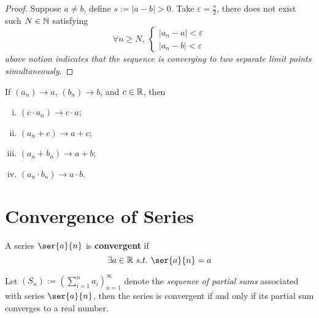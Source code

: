 \documentclass[11pt]{article}
\begin{document}
        \begin{proof}
            Suppose $a \neq b$, define $s:= |a-b| > 0$. Take $\varepsilon = \frac{s}{2}$, there does not exist such $N \in \mathbb{N}$ satisfying 
            \begin{equation}
                \forall n \geq N,\ 
                \begin{cases}
                    |a_n - a| < \varepsilon \\
                    |a_n - b| < \varepsilon
                \end{cases}
            \end{equation}
            \emph{above notion indicates that the sequence is converging to two separate limit points simultaneously}.
        \end{proof}
        
        \begin{theorem}
            If $(a_n) \to a$, $(b_n) \to b$, and $c \in \mathbb{R}$, then
            \begin{enumerate}[(i)]
                \item $(c \cdot a_n) \to c \cdot a$;
                \item $(a_n + c) \to a + c$;
                \item $(a_n + b_n) \to a + b$;
                \item $(a_n \cdot b_n) \to a \cdot b$.
            \end{enumerate}
        \end{theorem}
        
    \section{Convergence of Series}
        \begin{definition}
            A series $\ser{a}{n}$ is \textbf{convergent} if
            \begin{equation}
                \exists a \in \R\ s.t.\ \ser{a}{n} = a
            \end{equation}
        \end{definition}
        
        \begin{definition}
            Let $(S_n) := (\sum_{i=1}^n a_i)_{n=1}^\infty$ denote the \emph{sequence of partial sums} associated with series $\ser{a}{n}$, then the series is convergent if and only if its partial sum converges to a real number.
        \end{definition}
        
\end{document}
